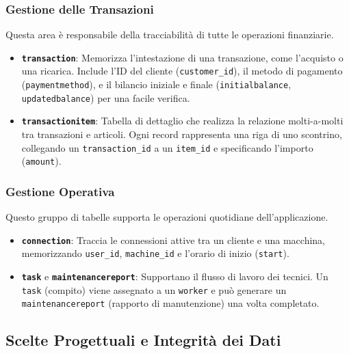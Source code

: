 \subsubsection{Gestione delle Transazioni}
Questa area è responsabile della tracciabilità di tutte le operazioni finanziarie.
\begin{itemize}
    \item \textbf{\texttt{transaction}}: Memorizza l'intestazione di una transazione, come l'acquisto o una ricarica. Include l'ID del cliente (\texttt{customer\_id}), il metodo di pagamento (\texttt{paymentmethod}), e il bilancio iniziale e finale (\texttt{initialbalance}, \texttt{updatedbalance}) per una facile verifica.
    \item \textbf{\texttt{transactionitem}}: Tabella di dettaglio che realizza la relazione molti-a-molti tra transazioni e articoli. Ogni record rappresenta una riga di uno scontrino, collegando un \texttt{transaction\_id} a un \texttt{item\_id} e specificando l'importo (\texttt{amount}).
\end{itemize}

\subsubsection{Gestione Operativa}
Questo gruppo di tabelle supporta le operazioni quotidiane dell'applicazione.
\begin{itemize}
    \item \textbf{\texttt{connection}}: Traccia le connessioni attive tra un cliente e una macchina, memorizzando \texttt{user\_id}, \texttt{machine\_id} e l'orario di inizio (\texttt{start}).
    \item \textbf{\texttt{task}} e \textbf{\texttt{maintenancereport}}: Supportano il flusso di lavoro dei tecnici. Un \texttt{task} (compito) viene assegnato a un \texttt{worker} e può generare un \texttt{maintenancereport} (rapporto di manutenzione) una volta completato.
\end{itemize}

\subsection{Scelte Progettuali e Integrità dei Dati}

